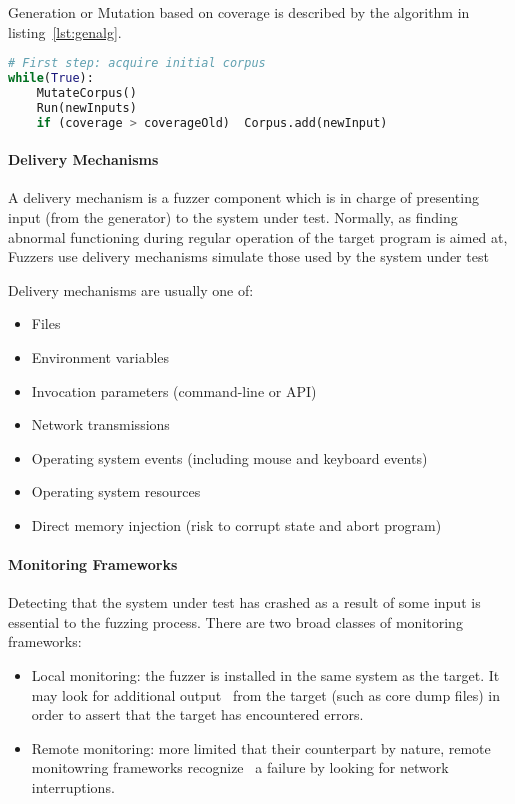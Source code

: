 Generation or Mutation based on coverage is described by the algorithm in listing~\ref{lst:genalg}.

\begin{lstlisting}[caption={Coverage based data generation}, label={lst:genalg}, language=python]
# First step: acquire initial corpus
while(True):
    MutateCorpus()
    Run(newInputs)
    if (coverage > coverageOld)  Corpus.add(newInput)

\end{lstlisting}


\paragraph{Delivery Mechanisms}

A delivery mechanism is a fuzzer component which is in charge of presenting input (from the generator)
to the system under test. Normally, as finding abnormal functioning during regular operation of the
target program is aimed at, Fuzzers use delivery mechanisms simulate those used by the system under test \cite{mcnally12}

Delivery mechanisms are usually one of:

\begin{itemize}
    \item Files
    \item Environment variables
    \item Invocation parameters (command-line or API)
    \item Network transmissions
    \item Operating system events (including mouse and keyboard events)
    \item Operating system resources
    \item Direct memory injection (risk to corrupt state and abort program)
\end{itemize}


\paragraph{Monitoring Frameworks}

Detecting that the system under test has crashed as a result of some input is essential to the fuzzing process.
There are two broad classes of monitoring frameworks\cite{mcnally12}:

\begin{itemize}
    \item Local monitoring: the fuzzer is installed in the same system as the target. It may look for additional output \
    from the target (such as core dump files) in order to assert that the target has encountered errors.
    \item Remote monitoring: more limited that their counterpart by nature, remote monitowring frameworks recognize \
    a failure by looking for network interruptions.
\end{itemize}

